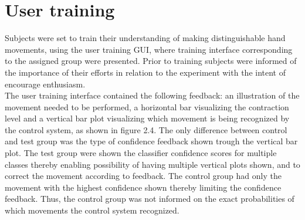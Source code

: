 
\section{User training}

Subjects were set to train their understanding of making distinguishable hand movements, using the user training GUI, where training interface corresponding to the assigned group were presented. Prior to training subjects were informed of the importance of their efforts in relation to the experiment with the intent of encourage enthusiasm. \\

The user training interface contained the following feedback: an illustration of the movement needed to
be performed, a horizontal bar visualizing the contraction level and a vertical bar plot visualizing which
movement is being recognized by the control system, as shown in figure 2.4. The only difference between control and test group was the type of confidence feedback shown trough the vertical bar plot. The test group were shown the classifier confidence scores for multiple classes thereby enabling possibility of having multiple vertical plots shown, and to correct the movement according to feedback. The control group had only the movement with the highest confidence shown thereby limiting the confidence feedback. Thus, the control group was not informed on the exact probabilities of which movements the control system recognized.      

